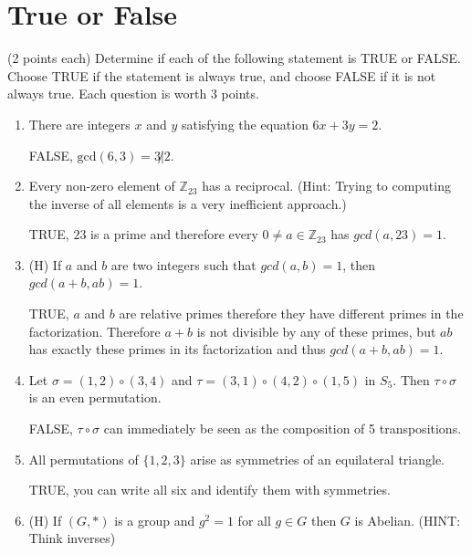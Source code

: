 \documentclass[12pt]{article}
\begin{document}
\newpage
\section*{True or False}

(2 points each) Determine if each of the following statement is TRUE or FALSE.\\Choose TRUE if the statement is always true, and choose FALSE if it is not always true. Each question is worth 3 points.

\vspace{0.2cm}



\begin{enumerate}
\item There are integers $x$ and $y$ satisfying the equation $6x+3y=2$. 

FALSE, $\textrm{gcd}(6,3)=3\not|2$.
\vspace{0.1cm}
\item Every non-zero element of $\mathbb{Z}_{23}$ has a reciprocal. (Hint: Trying to computing the inverse of all elements is a very inefficient approach.)

TRUE, $23$ is a prime and therefore every $0\neq a\in\mathbb{Z}_{23}$ has $gcd(a,23)=1$.
\vspace{0.1cm}
\item (H) If $a$ and $b$ are two integers such that $gcd(a,b)=1$, then $gcd(a+b,ab)=1$.

TRUE, $a$ and $b$ are relative primes therefore they have different primes in the factorization. Therefore $a+b$ is not divisible by any of these primes, but $ab$ has exactly these primes in its factorization and thus $gcd(a+b,ab)=1$.
\vspace{0.1cm}
\item Let $\sigma=(1,2)\circ (3,4)$ and $\tau=(3,1)\circ (4,2)\circ (1,5)$ in $S_5$. Then $\tau\circ \sigma$ is an even permutation.

FALSE, $\tau\circ\sigma$ can immediately be seen as the composition of 5 transpositions.
\vspace{0.1cm}
\item All permutations of $\{1,2,3\}$ arise as symmetries of an equilateral triangle.

TRUE, you can write all six and identify them with symmetries.
\vspace{0.1cm}
\item (H) If $(G,*)$ is a group and $g^2=1$ for all $g\in G$ then $G$ is Abelian. (HINT: Think inverses)


\end{enumerate}
\end{document}
